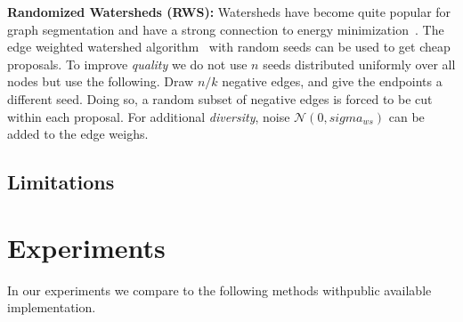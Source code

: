 \documentclass[10pt,twocolumn,letterpaper]{article}
\theoremstyle{definition}
\begin{document}
%

\noindent \textbf{Randomized Watersheds (RWS):}
Watersheds have become quite popular for
graph segmentation and have a strong connection
to energy minimization~\cite{couprie_2011}.
%
The edge weighted watershed algorithm~\cite{meyer_2013}
with random seeds can be used to get
cheap proposals.
To improve \emph{quality} we do not use $n$ seeds distributed uniformly
over all nodes but use the following.
%
Draw $n/k$ negative edges,  and give the endpoints a different seed.
Doing so, a random subset of negative edges is forced
to be cut within each proposal.
For additional \emph{diversity}, noise $\mathcal{N} (0, sigma_{ws})$
can be added to
the edge weighs.

%

\subsection{Limitations}




\section{Experiments}\label{sec:exp}
In our experiments we compare to the following methods withpublic available implementation.
\end{document}
